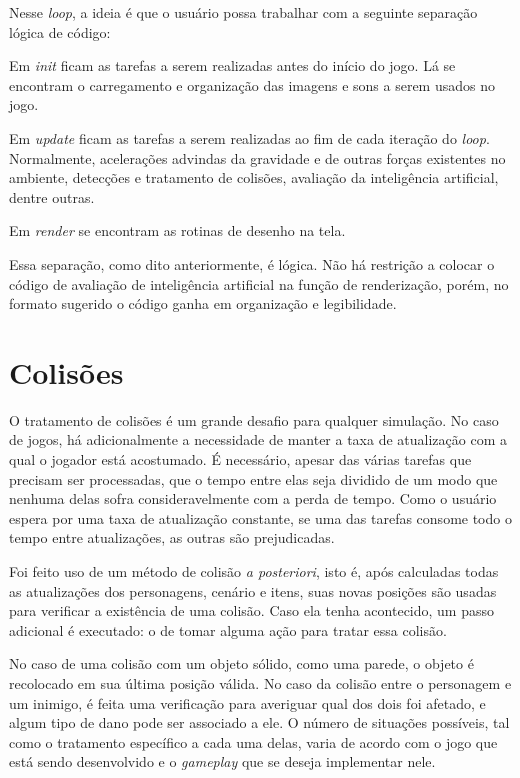 \documentclass[brazil]{abnt}
\begin{document}
Nesse \textit{loop}, a ideia é que o usuário possa trabalhar com a seguinte separação lógica de código:

Em \textit{init} ficam as tarefas a serem realizadas antes do início do jogo. Lá se encontram o carregamento e organização das imagens e sons a serem usados no jogo. 

Em \textit{update} ficam as tarefas a serem realizadas ao fim de cada iteração do \textit{loop}. Normalmente, acelerações advindas da gravidade e de outras forças existentes no ambiente, detecções e tratamento de colisões, avaliação da inteligência artificial, dentre outras.

Em \textit{render} se encontram as rotinas de desenho na tela.

Essa separação, como dito anteriormente, é lógica. Não há restrição a colocar o código de avaliação de inteligência artificial na função de renderização, porém, no formato sugerido o código ganha em organização e legibilidade.

\section{Colisões}

O tratamento de colisões é um grande desafio para qualquer simulação. No caso de jogos, há adicionalmente a necessidade de manter a taxa de atualização com a qual o jogador está acostumado. É necessário, apesar das várias tarefas que precisam ser processadas, que o tempo entre elas seja dividido de um modo que nenhuma delas sofra consideravelmente com a perda de tempo. Como o usuário espera por uma taxa de atualização constante, se uma das tarefas consome todo o tempo entre atualizações, as outras são prejudicadas.

Foi feito uso de um método de colisão \textit{a posteriori}, isto é, após calculadas todas as atualizações dos personagens, cenário e itens, suas novas posições são usadas para verificar a existência de uma colisão. Caso ela tenha acontecido, um passo adicional é executado: o de tomar alguma ação para tratar essa colisão.

No caso de uma colisão com um objeto sólido, como uma parede,  o objeto é recolocado em sua última posição válida. No caso da colisão entre o personagem e um inimigo, é feita uma verificação para averiguar qual dos dois foi afetado, e algum tipo de dano pode ser associado a ele. O número de situações possíveis, tal como o tratamento específico a cada uma delas, varia de acordo com o jogo que está sendo desenvolvido e o \textit{gameplay} que se deseja implementar nele.
\end{document}

